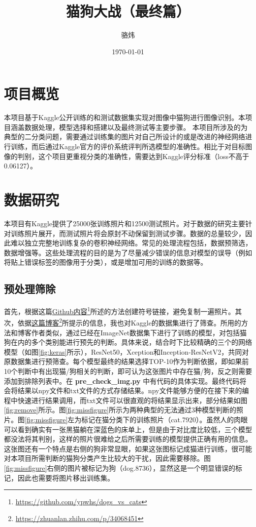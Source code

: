 \documentclass[a4paper,11pt]{article}
\author{骆炜}
\date{\today}
\title{猫狗大战（最终篇）}
\begin{document}
\maketitle
\tableofcontents


\section{项目概览}
\label{sec:org5b7cecf}
本项目基于Kaggle公开训练的和测试数据集实现对图像中猫狗进行图像识别。本项目涵盖数据处理，模型选择和搭建以及最终测试等主要步骤。
本项目所涉及的为典型的二分类问题，需要通过训练集的图片对自己所设计的或是改进的神经网络进行训练，而后通过Kaggle官方的评价系统评判所选模型的准确性。相比于对目标图像的判别，这个项目更重视分类的准确性，需要达到Kaggle评分标准（loss不高于0.06127）。

\section{数据研究}
\label{sec:orgf8b2730}
本项目有Kaggle提供了25000张训练照片和12500测试照片。对于数据的研究主要针对训练照片展开，而测试照片将会原封不动保留到测试步骤。数据的总量较少，因此难以独立完整地训练复杂的卷积神经网络。常见的处理流程包括，数据预筛选，数据增强等。这些处理流程的目的是为了尽量减少错误的信息对模型的误导（例如将贴上错误标签的图像用于分类），或是增加可用的训练的数据等。

\subsection{预处理筛除}
\label{sec:org59f6c32}
首先，根据这篇\href{https://github.com/ypwhs/dogs\_vs\_cats}{Github内容}\footnote{\url{https://github.com/ypwhs/dogs\_vs\_cats}}所述的方法创建符号链接，避免复制一遍照片。其次，依据\href{https://zhuanlan.zhihu.com/p/34068451}{这篇博客}\footnote{\url{https://zhuanlan.zhihu.com/p/34068451}}所提示的信息，我也对Kaggle的数据集进行了筛查。所用的方法和博客作者类似，通过已经在ImageNet数据集下进行了训练的模型，对包括猫狗在内的多个类别能进行预先的判断。具体来说，结合时下比较精确的三个的网络模型（如图\ref{fig:keras}所示），ResNet50，Xception和Inception-ResNetV2，共同对原数据集进行预筛查。每个模型最终的结果选择TOP-10作为判断依据，即如果前10个判断中有出现猫/狗相关的判断，即可认为这张图片中存在猫/狗，反之则需要添加到排除列表中。在 \textbf{pre\_check\_img.py} 中有代码的具体实现。最终代码将会将结果以npy文件和txt文件的方式存储结果。npy文件能够方便的在接下来的编程中快速进行结果调用，而txt文件可以很直观的将结果显示出来，部分结果如图\ref{fig:remove}所示。图\ref{fig:missfigure}所示为两种典型的无法通过3种模型判断的照片。图\ref{fig:missfigure}左为标记在猫分类下的训练照片（cat.7920）。虽然人的肉眼可以看到确实有一张黑猫躺在深蓝色的床单上，但是由于对比度比较低，三个模型都没法将其判别，这样的照片很难给之后所需要训练的模型提供正确有用的信息。这张图还有一个特点是右侧的狗非常显眼，如果这张图标记成猫进行训练，很可能对本项目所需判断的猫狗分类产生比较大的干扰，因此需要移除。图\ref{fig:missfigure}右侧的图片被标记为狗（dog.8736），显然这是一个明显错误的标记，因此也需要将图片移出训练集。
\end{document}
